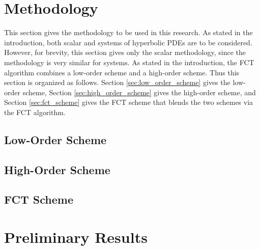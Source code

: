 \documentclass[12pt]{article}
\begin{document}
\section{Methodology\label{sec:methodology}}
This section gives the methodology to be used in this research. As stated in
the introduction, both scalar and systems of hyperbolic PDEs are to be
considered. However, for brevity, this section gives only the scalar
methodology, since the methodology is very similar for systems. As stated in the
introduction, the FCT algorithm combines a low-order scheme and a high-order
scheme.  Thus this section is organized as follows.  Section
\ref{sec:low_order_scheme} gives the low-order scheme, Section
\ref{sec:high_order_scheme} gives the high-order scheme, and Section
\ref{sec:fct_scheme} gives the FCT scheme that blends the two schemes via the
FCT algorithm.
\subsection{Low-Order Scheme\label{sec:low_order_scheme}}


\subsection{High-Order Scheme\label{sec:high_order_scheme}}


\subsection{FCT Scheme\label{sec:fct_scheme}}


\section{Preliminary Results\label{sec:results}}

\end{document}
